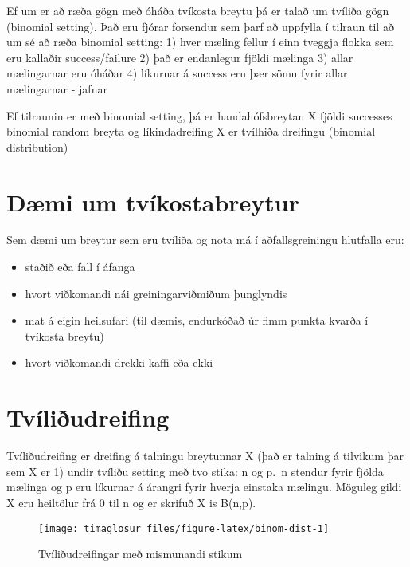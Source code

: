 \documentclass[]{book}
\providecommand{\tightlist}{%
  \setlength{\itemsep}{0pt}\setlength{\parskip}{0pt}}
\begin{document}
Ef um er að ræða gögn með óháða tvíkosta breytu þá er talað um tvíliða gögn (binomial setting). Það eru fjórar forsendur sem þarf að uppfylla í tilraun til að um sé að ræða binomial setting:
1) hver mæling fellur í einn tveggja flokka sem eru kallaðir success/failure
2) það er endanlegur fjöldi mælinga
3) allar mælingarnar eru óháðar
4) líkurnar á success eru þær sömu fyrir allar mælingarnar - jafnar

Ef tilraunin er með binomial setting, þá er handahófsbreytan X fjöldi successes binomial random breyta og líkindadreifing X er tvílhiða dreifingu (binomial distribution)

\hypertarget{duxe6mi-um-tvuxedkostabreytur}{%
\section{Dæmi um tvíkostabreytur}\label{duxe6mi-um-tvuxedkostabreytur}}

Sem dæmi um breytur sem eru tvíliða og nota má í aðfallsgreiningu hlutfalla eru:

\begin{itemize}
\tightlist
\item
  staðið eða fall í áfanga
\item
  hvort viðkomandi nái greiningarviðmiðum þunglyndis
\item
  mat á eigin heilsufari (til dæmis, endurkóðað úr fimm punkta kvarða í tvíkosta breytu)
\item
  hvort viðkomandi drekki kaffi eða ekki
\end{itemize}

\hypertarget{tvuxedliuxf0udreifing}{%
\section{Tvíliðudreifing}\label{tvuxedliuxf0udreifing}}

Tvíliðudreifing er dreifing á talningu breytunnar X (það er talning á tilvikum þar sem X er 1) undir tvíliðu setting með tvo stika: n og p.~n stendur fyrir fjölda mælinga og p eru líkurnar á árangri fyrir hverja einstaka mælingu. Möguleg gildi X eru heiltölur frá 0 til n og er skrifuð X is B(n,p).

\begin{figure}

{\centering \texttt{[image: timaglosur\_files/figure-latex/binom-dist-1]} 

}

\caption{Tvíliðudreifingar með mismunandi stikum}\label{fig:binom-dist}
\end{figure}
\end{document}
